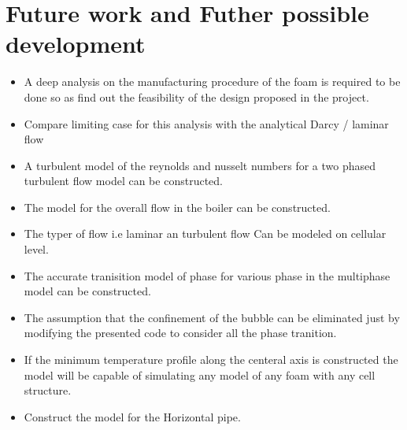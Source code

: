 \documentclass[compileTAMUreport.tex]{subfiles}
\begin{document}
\chapter{Future work and Futher possible development}
\begin{itemize}
\item A deep analysis on the manufacturing procedure of the foam is required to be done so as find out the feasibility of the design proposed in the project.

\item Compare limiting case for this analysis with the analytical Darcy / laminar flow 


\item A turbulent model of the reynolds and nusselt numbers for a two phased turbulent flow model can be constructed.

\item The model for the overall flow in the boiler can be constructed.

\item The typer of flow i.e laminar an turbulent flow Can be modeled on cellular level. 

\item The accurate tranisition model of phase for various phase in the multiphase model can be constructed.

\item The assumption that the confinement of the bubble can be eliminated just by modifying the presented code to consider all the phase tranition.

\item If the minimum temperature profile along the centeral axis is constructed the model will be capable of simulating any model of any foam with any cell structure. 

\item Construct the model for the Horizontal pipe.
\end{itemize}
\end{document}
